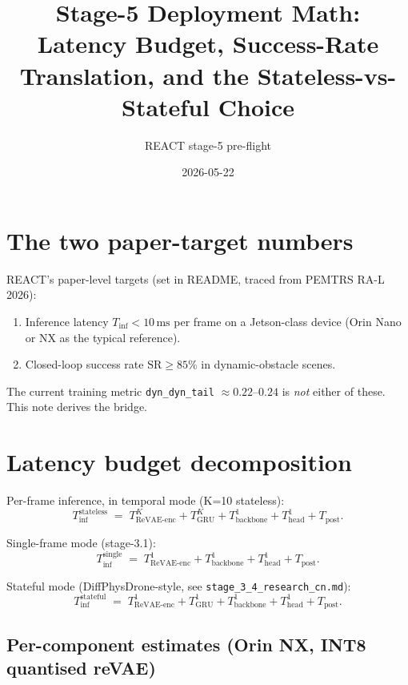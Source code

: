 \documentclass[11pt]{article}
\title{Stage-5 Deployment Math:\\
       Latency Budget, Success-Rate Translation, and the Stateless-vs-Stateful Choice}
\author{REACT stage-5 pre-flight}
\date{2026-05-22}
\newcommand{\ms}{\,\text{ms}}
\begin{document}
\maketitle

\section{The two paper-target numbers}

REACT's paper-level targets (set in README, traced from PEMTRS RA-L 2026):
\begin{enumerate}
  \item Inference latency $T_{\text{inf}} < 10\ms$ per frame on a Jetson-class
        device (Orin Nano or NX as the typical reference).
  \item Closed-loop success rate $\text{SR} \geq 85\%$ in dynamic-obstacle
        scenes.
\end{enumerate}

The current training metric \texttt{dyn\_dyn\_tail} $\approx 0.22$--$0.24$ is
\emph{not} either of these. This note derives the bridge.

\section{Latency budget decomposition}

Per-frame inference, in temporal mode (K=10 stateless):
\begin{equation}\label{eq:latency-stateless}
T_{\text{inf}}^{\text{stateless}}
\;=\;
T_{\text{ReVAE-enc}}^{K} + T_{\text{GRU}}^{K} + T_{\text{backbone}}^{1} +
T_{\text{head}}^{1} + T_{\text{post}}.
\end{equation}

Single-frame mode (stage-3.1):
\begin{equation}\label{eq:latency-single}
T_{\text{inf}}^{\text{single}}
\;=\;
T_{\text{ReVAE-enc}}^{1} + T_{\text{backbone}}^{1} +
T_{\text{head}}^{1} + T_{\text{post}}.
\end{equation}

Stateful mode (DiffPhysDrone-style, see \texttt{stage\_3\_4\_research\_cn.md}):
\begin{equation}\label{eq:latency-stateful}
T_{\text{inf}}^{\text{stateful}}
\;=\;
T_{\text{ReVAE-enc}}^{1} + T_{\text{GRU}}^{1} + T_{\text{backbone}}^{1} +
T_{\text{head}}^{1} + T_{\text{post}}.
\end{equation}

\subsection{Per-component estimates (Orin NX, INT8 quantised reVAE)}
\end{document}
